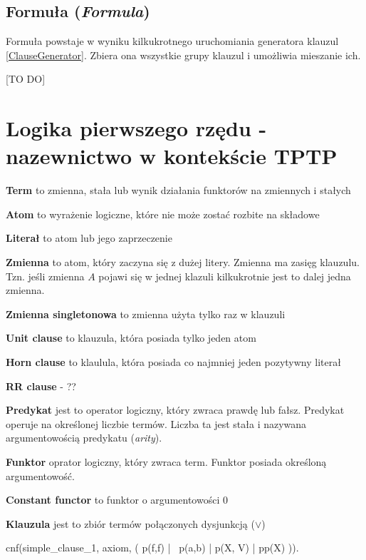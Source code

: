 \documentclass[a4paper,12pt]{article}
\begin{document}
\subsection{Formuła (\textit{Formula})}

Formuła powstaje w wyniku kilkukrotnego uruchomiania generatora klauzul \ref{ClauseGenerator}. Zbiera ona wszystkie grupy klauzul i umożliwia mieszanie ich.

[TO DO]
\section{Logika pierwszego rzędu - nazewnictwo w kontekście TPTP}

\textbf{Term}
to zmienna, stała lub wynik działania funktorów na zmiennych i stałych

\textbf{Atom}
to wyrażenie logiczne, które nie może zostać rozbite na składowe


\textbf{Literał}
to atom lub jego zaprzeczenie

\textbf{Zmienna}
to atom, który zaczyna się z dużej litery. Zmienna ma zasięg klauzulu. Tzn. jeśli zmienna $A$ pojawi się w jednej klazuli kilkukrotnie jest to dalej jedna zmienna.

\textbf{Zmienna singletonowa}
to zmienna użyta tylko raz w klauzuli

\textbf{Unit clause}
to klauzula, która posiada tylko jeden atom

\textbf{Horn clause}
to klaulula, która posiada co najmniej jeden pozytywny literał

\textbf{RR clause} - ??

\textbf{Predykat}
jest to operator logiczny, który zwraca prawdę lub fałsz. Predykat operuje na określonej liczbie termów. Liczba ta jest stała i nazywana argumentowością predykatu (\textit{arity}).

\textbf{Funktor}
oprator logiczny, który zwraca term. Funktor posiada określoną argumentowość.

\textbf{Constant functor}
to funktor o argumentowości 0

\textbf{Klauzula}
jest to zbiór termów połączonych dysjunkcją ($\lor$)


\begin{tptpcode}
cnf(simple_clause_1, axiom,
    ( p(f,f) | ~p(a,b) | p(X, V) | pp(X) )).
 
\end{tptpcode}
\end{document}
